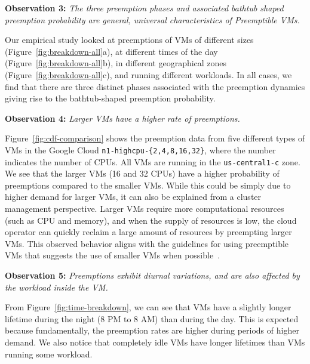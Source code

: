 \noindent \textbf{Observation 3:} \emph{The three preemption phases and associated bathtub shaped preemption probability are general, universal characteristics of Preemptible VMs.}

Our empirical study looked at preemptions of VMs of different sizes (Figure~\ref{fig:breakdown-all}a), at different times of the day (Figure~\ref{fig:breakdown-all}b), in different geographical zones (Figure~\ref{fig:breakdown-all}c), and running different workloads. 
In all cases, we find that there are three distinct phases associated with the preemption dynamics giving rise to the bathtub-shaped preemption probability. 


\noindent \textbf{Observation 4:}\emph{ Larger VMs have a higher rate of preemptions.}

Figure~\ref{fig:cdf-comparison} shows the preemption data from five different types of VMs in the Google Cloud \texttt{n1-highcpu-\{2,4,8,16,32\}}, where the number indicates the number of CPUs.
All VMs are running in the \texttt{us-central1-c} zone. 
We see that the larger VMs (16 and 32 CPUs) have a higher probability of preemptions compared to the smaller VMs.
While this could be simply due to higher demand for larger VMs, it can also be explained from a cluster management perspective. 
Larger VMs require more computational resources (such as CPU and memory), and when the supply of resources is low, the cloud operator can quickly reclaim a large amount of resources by preempting larger VMs.
This observed behavior aligns with the guidelines for using preemptible VMs that suggests the use of smaller VMs when possible~\cite{preemptible-documentation}. 

\noindent \textbf{Observation 5:} \emph{Preemptions exhibit diurnal variations, and are also affected by the workload inside the VM.}

From Figure~\ref{fig:time-breakdown}, we can see that VMs have a slightly longer lifetime during the night (8 PM to 8 AM) than during the day\footnotemark. 
This is expected because fundamentally, the preemption rates are higher during periods of higher demand. 
%
We also notice that completely idle VMs have longer lifetimes than VMs running some workload.


